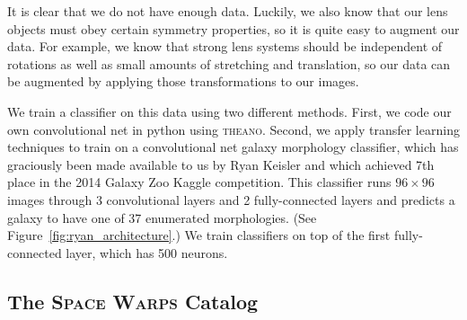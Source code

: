 \documentclass[10pt,twocolumn,letterpaper]{article}
\begin{document}
It is clear that we do not have enough data. Luckily, we also know that our
lens objects must obey certain symmetry properties, so it is quite easy to
augment our data. For example, we know that strong lens systems should be
independent of rotations as well as small amounts of stretching and
translation, so our data can be augmented by applying those transformations to
our images.

We train a classifier on this data using two different methods. First,
we code our own convolutional net in python using \textsc{theano}. Second,
we apply transfer learning techniques to train on a convolutional net
galaxy morphology classifier, which has graciously been made available to us by
Ryan Keisler and which achieved 7th place in the 2014 Galaxy Zoo Kaggle
competition.  This classifier runs $96\times96$ images through 3 convolutional
layers and 2 fully-connected layers and predicts a galaxy to have one of 37
enumerated morphologies. (See Figure~\ref{fig:ryan_architecture}.) We
train classifiers on top of the first fully-connected layer, which has 500
neurons.

\subsection{The \textsc{Space Warps} Catalog}
\end{document}
